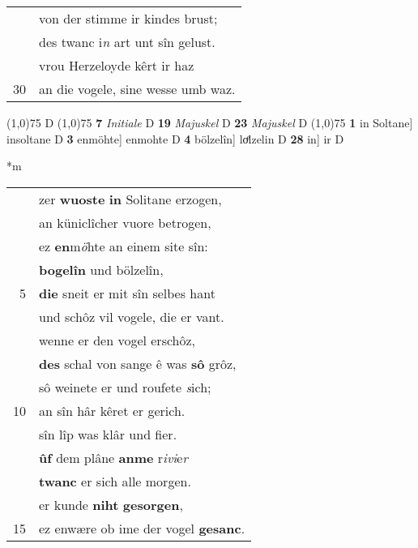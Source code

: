 \documentclass[8pt,a4paper,notitlepage]{article}
\begin{document}
\begin{table}[ht]
\begin{minipage}[t]{0.5\linewidth}
\begin{tabular}{rl}
 & von der stimme ir kindes brust;\\ 
 & des twanc i\textit{n} art unt sîn gelust.\\ 
 & vrou Herzeloyde kêrt ir haz\\ 
30 & an die vogele, sine wesse umb waz.\\ 
\end{tabular}
\scriptsize
\line(1,0){75} \newline
D \newline
\line(1,0){75} \newline
\textbf{7} \textit{Initiale} D  \textbf{19} \textit{Majuskel} D  \textbf{23} \textit{Majuskel} D  \newline
\line(1,0){75} \newline
\textbf{1} in Soltane] insoltane D \textbf{3} enmöhte] enmohte D \textbf{4} bölzelîn] loͤlzelin D \textbf{28} in] ir D \newline
\end{minipage}
\hspace{0.5cm}
\begin{minipage}[t]{0.5\linewidth}
\small
\begin{center}*m
\end{center}
\begin{tabular}{rl}
 & zer \textbf{wuoste} \textbf{in} Solitane erzogen,\\ 
 & an küniclîcher vuore betrogen,\\ 
 & ez \textbf{en}m\textit{ö}hte an einem site sîn:\\ 
 & \textbf{bogelîn} und bölzelîn,\\ 
5 & \textbf{die} sneit er mit sîn selbes hant\\ 
 & und schôz vil vogele, die er vant.\\ 
 & wenne er den vogel erschôz,\\ 
 & \textbf{des} schal von sange ê was \textbf{sô} grôz,\\ 
 & sô weinete er und roufete \textit{s}ich;\\ 
10 & an sîn hâr kêret er gerich.\\ 
 & sîn lîp was klâr und fier.\\ 
 & \textbf{ûf} dem plâne \textbf{anme} r\textit{ivi}e\textit{r}\\ 
 & \textbf{twanc} er sich alle morgen.\\ 
 & er kunde \textbf{niht} \textbf{gesorgen},\\ 
15 & ez enwære ob ime der vogel \textbf{gesanc}.\\ 

\end{tabular}
\end{minipage}
\end{table}
\end{document}
